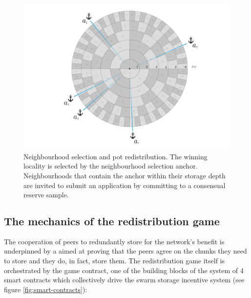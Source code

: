 \begin{figure}[!ht]
  \centering
    \includegraphics[width=\textwidth]{fig/nhd-selection.pdf}
  \caption[Neighbourhood selection and pot redistribution]{Neighbourhood selection and pot redistribution. The winning locality is selected by the neighbourhood selection anchor. Neighbourhoods that contain the anchor within their storage depth are invited to submit an application by committing to a consensual reserve sample. }
\label{fig:neighbourhood-selection}
\end{figure}    

    


\subsection{The mechanics of the redistribution game}\label{sec:mechanics}

The cooperation of peers to redundantly store for the network's benefit is underpinned by a 
aimed at proving that the peers agree on the chunks they need to store and they do, in fact, store them. The redistribution game itself is orchestrated by the game contract, one of the building blocks of the system of 4 smart contracts which collectively drive the swarm storage incentive system (see figure \ref{fig:smart-contracts}):

